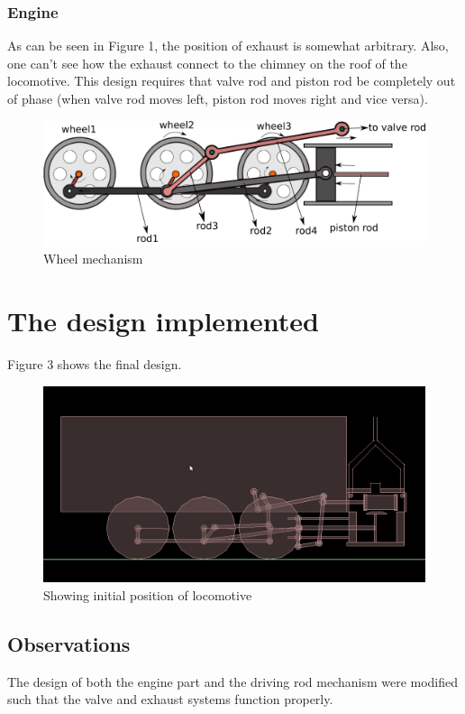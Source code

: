 \documentclass[pdftex,12pt,a4paper]{article}
\begin{document}
\subsubsection{Engine}
\par{As can be seen in Figure 1, the position of exhaust is somewhat arbitrary. Also, one can't see how the exhaust connect to the chimney on the roof of the locomotive. This design requires that valve rod and piston rod be completely out of phase (when valve rod moves left, piston rod moves right and vice versa).}

\begin{figure}[H]
\centering
\includegraphics[scale=.60]{../images/oldlabel.png}
\caption{Wheel mechanism}
\end{figure}

\section{The design implemented}

\par{Figure 3 shows the final design.\cite{model1}}

\begin{figure}[H]
\centering
\includegraphics[scale=.37]{../images/slnew.png}
\caption{Showing initial position of locomotive}
\end{figure}

\subsection{Observations}
\par{The design of both the engine part and the driving rod mechanism were modified such that the valve and exhaust systems function properly.}
\end{document}

